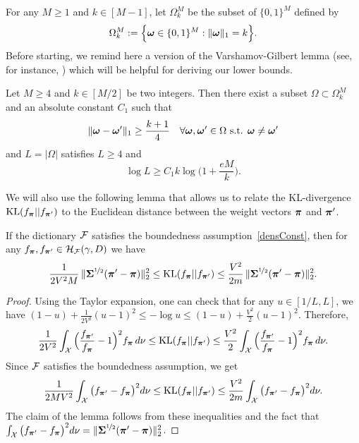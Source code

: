 For any $M\geq 1$ and $k\in [M-1]$, let  $\Omega_k^M$ be the subset of $\{0,1\}^M$ defined by
\begin{equation}
\Omega_k^M := \Big \{\boldsymbol \omega \in \{0,1\}^M : \|\boldsymbol \omega\|_1=k \Big\}.
\end{equation}
Before starting, we remind here a version of the Varshamov-Gilbert lemma (see, for instance, \citep[Lemma 8.3]{RT11})
which will be helpful for deriving our lower bounds.
\begin{lemma}
	\label{rigollet8.3}
	Let $M\geq 4$ and $k\in[M/2]$ be two integers. Then there exist a subset $\Omega \subset \Omega_k^M$ and an absolute constant $C_1$
	such that
	\begin{equation}
	\|\boldsymbol \omega-\boldsymbol \omega'\|_1 \geq \frac{k+1}{4} \quad \forall \boldsymbol \omega,\boldsymbol \omega' \in \Omega \text{ \rm s.t. } \boldsymbol \omega \neq \boldsymbol \omega'
	\end{equation}
	and $L=|\Omega|$ satisfies $L\ge 4$ and
	\begin{equation}
	\log L  \geq C_1 k\log\Big(1+\frac{eM}{ k}\Big).
	\end{equation}
\end{lemma}
We will also use the following lemma that allows us to relate the KL-divergence ${\rm KL}(f_{\boldsymbol \pi}||f_{\boldsymbol \pi'})$ 
to the Euclidean distance between the weight vectors $\boldsymbol \pi$ and $\boldsymbol \pi'$. 
\begin{lemma}
	\label{lemma:KLboundsLT}
	If the dictionary $\mathcal F$ satisfies the boundedness assumption~\eqref{densConst}, then for any
	$f_{\boldsymbol \pi}, f_{\boldsymbol \pi'}\in \mathcal H_\mathcal F(\gamma,D)$ we have
	\begin{equation}
	\frac{1}{2V^2M}\,\|\boldsymbol\Sigma^{\nicefrac12}(\boldsymbol \pi'-\boldsymbol \pi)\|_2^2
	\leq {\rm KL}(f_{\boldsymbol \pi}||f_{\boldsymbol \pi'})
	\leq \frac{V^2}{2m}\,\|\boldsymbol\Sigma^{\nicefrac12}(\boldsymbol \pi'-\boldsymbol \pi)\|_2^2.
	\end{equation}
\end{lemma}
\begin{proof}
	Using the Taylor expansion, one can check that for any $u\in[1/L,L]$, we
	have $(1-u)+ \frac{1}{2V^2}(u-1)^2 \leq -\log u \leq (1-u)+\frac{V^2}{2}(u-1)^2$.
	Therefore,
	\begin{equation}
	\frac{1}{2V^2}\int_{\mathcal X}\Big(\frac{f_{\boldsymbol \pi'}}{f_{\boldsymbol \pi}}-1\Big)^2f_{\boldsymbol \pi}\,d\nu
	\leq {\rm KL}(f_{\boldsymbol \pi}||f_{\boldsymbol \pi'}) \leq \frac{V^2}{2}\int_{\mathcal X}\Big(\frac{f_{\boldsymbol \pi'}}{f_{\boldsymbol \pi}}-1\Big)^2
	f_{\boldsymbol \pi}\,d\nu.
	\end{equation}
	Since $\mathcal F$ satisfies the boundedness assumption, we get
	\begin{equation}
	\label{KLboundsLT}
	\frac{1}{2MV^2}\int_{\mathcal X}\big(f_{\boldsymbol \pi'}-f_{\boldsymbol \pi}\big)^2d\nu
	\leq {\rm KL}(f_{\boldsymbol \pi}||f_{\boldsymbol \pi'}) \leq \frac{V^2}{2m}\int_{\mathcal X}\big(f_{\boldsymbol \pi'}-f_{\boldsymbol \pi}\big)^2d\nu.
	\end{equation}
	The claim of the lemma follows from these inequalities and the fact that
	$\int_{\mathcal X}\big(f_{\boldsymbol \pi'}-f_{\boldsymbol \pi}\big)^2d\nu = \|\boldsymbol\Sigma^{\nicefrac12}(\boldsymbol \pi'-\boldsymbol \pi)\|_2^2$.
\end{proof}



